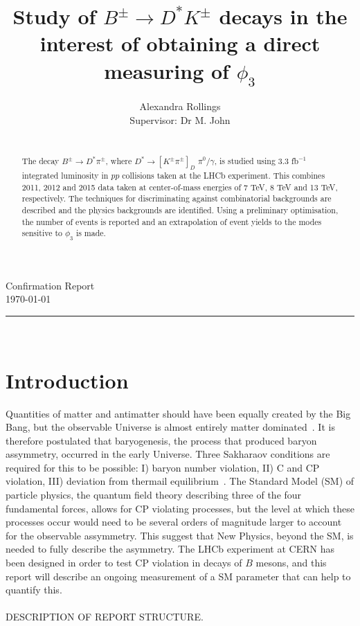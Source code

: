 \documentclass[oneside,12pt]{article}
\title{
      \LARGE \textbf{Study of $B^{\pm} \rightarrow D^{*}K^{\pm}$ decays in the interest of obtaining a direct measuring of $\phi_3$} \\
		}
\author{
		Alexandra Rollings\\	
		Supervisor: Dr M. John\\	
}
\makeatletter
\newcommand{\HRule}[1]{\rule{\linewidth}{#1}}     %
\def\printtitle{%
  {\centering \@title\par}}
\def\printauthor{%
  {\centering \large \@author}}
\makeatother
\begin{document}
\begin{titlepage}
\thispagestyle{empty} 
\begin{flushright}
\normalsize {Confirmation Report} 	%
\\ \normalsize \today			%
\end{flushright}
\HRule{0.5pt} \\						%
[2.0cm]
\printtitle 
\vspace{75pt}
\printauthor
\vfill
\begin{abstract}
\noindent
\\
  The decay $B^{\pm} \rightarrow D^{*}\pi^{\pm}$, where $D^{*} \rightarrow [K^{\pm}\pi^{\pm}]_D$ $\pi^{0}\text{/}\gamma$, is studied using 3.3 fb$^{-1}$ integrated luminosity in $pp$ collisions taken at the LHCb experiment. This combines 2011, 2012 and 2015 data taken at center-of-mass energies of 7 TeV, 8 TeV and 13 TeV, respectively. The techniques for discriminating
  against combinatorial backgrounds are described and the physics backgrounds are identified. Using a preliminary optimisation, the number of events is reported and an extrapolation of event yields to the modes sensitive to $\phi_3$ is made. 
\end{abstract}
\vfill
\end{titlepage}
\setcounter{page}{1}
\section{\normalsize Introduction}
Quantities of matter and antimatter should have been equally created by the Big Bang, but the observable Universe is almost entirely matter dominated~\cite{UniAsymmetry}. It is therefore postulated that baryogenesis, the process that produced baryon assymmetry, occurred in the early Universe. Three Sakharaov conditions are required for this to be possible: I) baryon number violation, II) C and CP violation, III) deviation from thermail equilibrium~\cite{Sakharov}. The Standard Model (SM) of particle physics, the quantum field
theory describing three of the four fundamental forces, allows for CP violating processes, but the level at which these processes occur would need to be several orders of magnitude larger to account for the observable assymmetry. This suggest that New Physics,
beyond the SM, is needed to fully describe the asymmetry. The LHCb experiment at CERN has been designed in order to test CP violation in decays of $B$ mesons, and this report will describe an ongoing measurement of a SM parameter that can help to quantify this. \\ 
\\
DESCRIPTION OF REPORT STRUCTURE.
\end{document}
